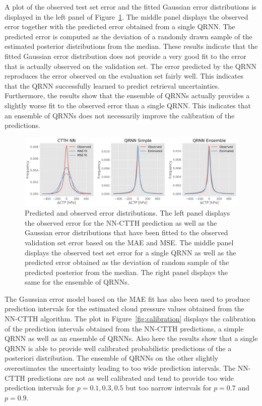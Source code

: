 \documentclass[journal abbreviation, manuscript]{copernicus}
\begin{document}
A plot of the observed test set error and the fitted Gaussian error
distributions is displayed in the left panel of Figure~\ref{fig:error_fit}. The
middle panel displays the observed error together with the predicted error
obtained from a single QRNN. The predicted error is computed as the deviation of
a randomly drawn sample of the estimated posterior distributions from the
median. These results indicate that the fitted Gaussian error distribution does
not provide a very good fit to the error that is actually observed on the
validation set. The error predicted by the QRNN reproduces the error observed on
the evaluation set fairly well. This indicates that the QRNN successfully
learned to predict retrieval uncertainties. Furthermore, the results show that
the ensemble of QRNNs actually provides a slightly worse fit to the observed
error than a single QRNN. This indicates that an ensemble of QRNNs does not
necessarily improve the calibration of the predictions.

  \begin{figure}[hbpt!]
    \centering
    \includegraphics[width = 0.8\linewidth]{../plots/ctp_error_fit}
    \caption{Predicted and observed error distributions. The left panel
      displays the observed error for the NN-CTTH prediction as well as the
      Gaussian error distributions that have been fitted to the observed
      validation set error based on the MAE and MSE. The middle panel
      displays the observed test set error for a single QRNN as well as the
      predicted error obtained as the deviation of random sample of the
      predicted posterior from the median. The right panel displays
      the same for the ensemble of QRNNs.}
    \label{fig:error_fit}
  \end{figure}

The Gaussian error model based on the MAE fit has also been used to produce
prediction intervals for the estimated cloud pressure values obtained from the
NN-CTTH algorithm. The plot in Figure~\ref{fig:calibration} displays the
calibration of the prediction intervals obtained from the NN-CTTH predictions,
a simple QRNN as well as an ensemble of QRNNs. Also here the results show that
a single QRNN is able to provide well calibrated probabilistic predictions of
the a posteriori distribution. The ensemble of QRNNs on the other slightly
overestimates the uncertainty leading to too wide prediction intervals. The
NN-CTTH predictions are not as well calibrated and tend to provide too wide
prediction intervals for $p = 0.1, 0.3, 0.5$ but too narrow intervals for $p =
0.7$ and $p = 0.9$.
\end{document}
